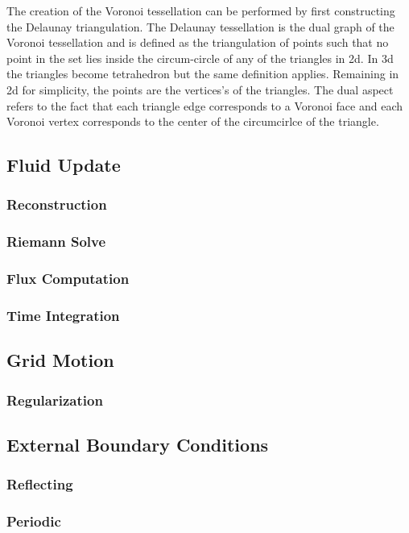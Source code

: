 The creation of the Voronoi tessellation can be performed by first constructing the Delaunay
triangulation. The Delaunay tessellation is the dual graph of the Voronoi tessellation and is
defined as the triangulation of points such that no point in the set lies inside the 
circum-circle of any of the triangles in 2d. In 3d the triangles become tetrahedron but
the same definition applies. Remaining in 2d for simplicity, the points are the vertices's
of the triangles. The dual aspect refers to the fact that each triangle edge corresponds to
a Voronoi face and each Voronoi vertex corresponds to the center of the circumcirlce of the
triangle. 

\subsection{Fluid Update}
\subsubsection{Reconstruction}
\subsubsection{Riemann Solve}
\subsubsection{Flux Computation}
\subsubsection{Time Integration}

\subsection{Grid Motion}
\subsubsection{Regularization}

\subsection{External Boundary Conditions}
\subsubsection{Reflecting}
\subsubsection{Periodic}

